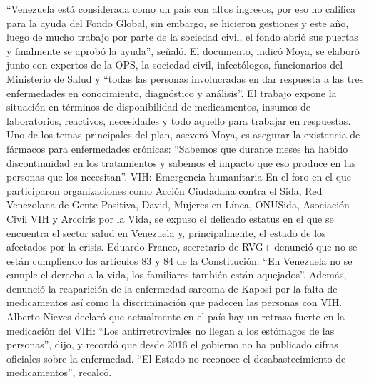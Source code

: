 \documentclass{article}%
\begin{document}
\newline%
%
“Venezuela está considerada como un país con altos ingresos, por eso no califica para la ayuda del Fondo Global, sin embargo, se hicieron gestiones y este año, luego de mucho trabajo por parte de la sociedad civil, el fondo abrió sus puertas y finalmente se aprobó la ayuda”, señaló.%
\newline%
%
El documento, indicó Moya, se elaboró junto con expertos de la OPS, la sociedad civil, infectólogos, funcionarios del Ministerio de Salud y “todas las personas involucradas en dar respuesta a las tres enfermedades en conocimiento, diagnóstico y análisis”. El trabajo expone la situación en términos de disponibilidad de medicamentos, insumos de laboratorios, reactivos, necesidades y todo aquello para trabajar en respuestas.%
\newline%
%
Uno de los temas principales del plan, aseveró Moya, es asegurar la existencia de fármacos para enfermedades crónicas: “Sabemos que durante meses ha habido discontinuidad en los tratamientos y sabemos el impacto que eso produce en las personas que los necesitan”.%
\newline%
%
VIH: Emergencia humanitaria%
\newline%
%
En el foro en el que participaron organizaciones como Acción Ciudadana contra el Sida, Red Venezolana de Gente Positiva, David, Mujeres en Línea, ONUSida, Asociación Civil VIH y Arcoiris por la Vida, se expuso el delicado estatus en el que se encuentra el sector salud en Venezuela y, principalmente, el estado de los afectados por la crisis. Eduardo Franco, secretario de RVG+ denunció que no se están cumpliendo los artículos 83 y 84 de la Constitución: “En Venezuela no se cumple el derecho a la vida, los familiares también están aquejados”. Además, denunció la reaparición de la enfermedad sarcoma de Kaposi por la falta de medicamentos así como la discriminación que padecen las personas con VIH.%
\newline%
%
Alberto Nieves declaró que actualmente en el país hay un retraso fuerte en la medicación del VIH: “Los antirretrovirales no llegan a los estómagos de las personas”, dijo, y recordó que desde 2016 el gobierno no ha publicado cifras oficiales sobre la enfermedad. “El Estado no reconoce el desabastecimiento de medicamentos”, recalcó.%
\newline%
%
\end{document}
